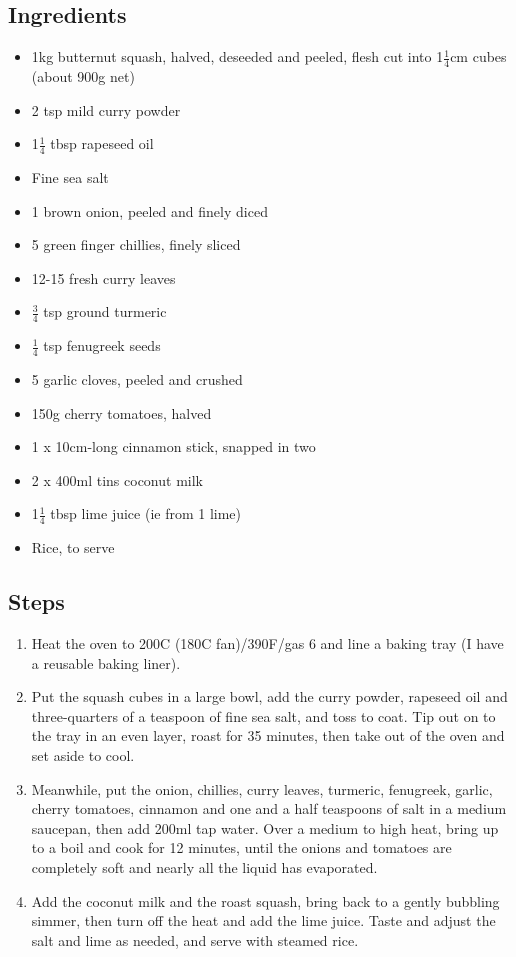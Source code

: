 \documentclass{book}
\begin{document}
\subsection*{Ingredients}
\begin{itemize}
\item 1kg butternut squash, halved, deseeded and peeled, flesh cut into 1$\frac{1}{4}$cm cubes (about 900g net)
\item 2 tsp mild curry powder
\item 1$\frac{1}{4}$ tbsp rapeseed oil
\item Fine sea salt
\item 1 brown onion, peeled and finely diced
\item 5 green finger chillies, finely sliced
\item 12-15 fresh curry leaves
\item $\frac{3}{4}$ tsp ground turmeric
\item $\frac{1}{4}$ tsp fenugreek seeds
\item 5 garlic cloves, peeled and crushed
\item 150g cherry tomatoes, halved
\item 1 x 10cm-long cinnamon stick, snapped in two
\item 2 x 400ml tins coconut milk
\item 1$\frac{1}{4}$ tbsp lime juice (ie from 1 lime)
\item Rice, to serve
\end{itemize}

\subsection*{Steps}
\begin{enumerate}
\item Heat the oven to 200C (180C fan)/390F/gas 6 and line a baking tray (I have a reusable baking liner).
\item Put the squash cubes in a large bowl, add the curry powder, rapeseed oil and three-quarters of a teaspoon of fine sea salt, and toss to coat. Tip out on to the tray in an even layer, roast for 35 minutes, then take out of the oven and set aside to cool.
\item Meanwhile, put the onion, chillies, curry leaves, turmeric, fenugreek, garlic, cherry tomatoes, cinnamon and one and a half teaspoons of salt in a medium saucepan, then add 200ml tap water. Over a medium to high heat, bring up to a boil and cook for 12 minutes, until the onions and tomatoes are completely soft and nearly all the liquid has evaporated. 
\item Add the coconut milk and the roast squash, bring back to a gently bubbling simmer, then turn off the heat and add the lime juice. Taste and adjust the salt and lime as needed, and serve with steamed rice.
\end{enumerate}
\newpage
\end{document}
